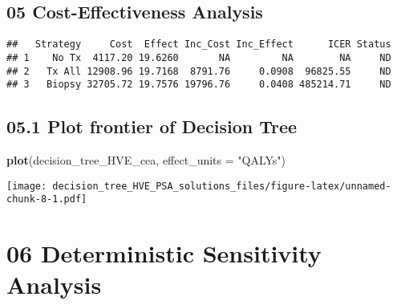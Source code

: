 \documentclass[
]{article}
\newenvironment{Shaded}{\begin{snugshade}}{\end{snugshade}}
\newcommand{\CommentTok}[1]{\textcolor[rgb]{0.56,0.35,0.01}{\textit{#1}}}
\newcommand{\DataTypeTok}[1]{\textcolor[rgb]{0.13,0.29,0.53}{#1}}
\newcommand{\KeywordTok}[1]{\textcolor[rgb]{0.13,0.29,0.53}{\textbf{#1}}}
\newcommand{\NormalTok}[1]{#1}
\newcommand{\OperatorTok}[1]{\textcolor[rgb]{0.81,0.36,0.00}{\textbf{#1}}}
\newcommand{\StringTok}[1]{\textcolor[rgb]{0.31,0.60,0.02}{#1}}
\begin{document}
\hypertarget{cost-effectiveness-analysis}{%
\subsection{05 Cost-Effectiveness
Analysis}\label{cost-effectiveness-analysis}}

\begin{Shaded}
\end{Shaded}

\begin{verbatim}
##   Strategy     Cost  Effect Inc_Cost Inc_Effect      ICER Status
## 1    No Tx  4117.20 19.6260       NA         NA        NA     ND
## 2   Tx All 12908.96 19.7168  8791.76     0.0908  96825.55     ND
## 3   Biopsy 32705.72 19.7576 19796.76     0.0408 485214.71     ND
\end{verbatim}

\hypertarget{plot-frontier-of-decision-tree}{%
\subsection{05.1 Plot frontier of Decision
Tree}\label{plot-frontier-of-decision-tree}}

\begin{Shaded}
\begin{Highlighting}[]
\KeywordTok{plot}\NormalTok{(decision_tree_HVE_cea, }\DataTypeTok{effect_units =} \StringTok{"QALYs"}\NormalTok{)}
\end{Highlighting}
\end{Shaded}

\texttt{[image: decision\_tree\_HVE\_PSA\_solutions\_files/figure-latex/unnamed-chunk-8-1.pdf]}

\hypertarget{deterministic-sensitivity-analysis}{%
\section{06 Deterministic Sensitivity
Analysis}\label{deterministic-sensitivity-analysis}}
\end{document}
